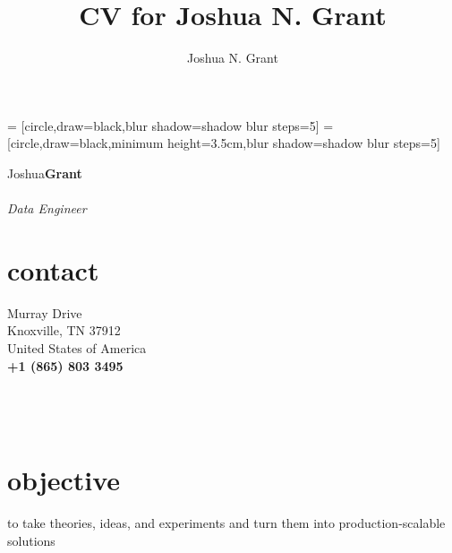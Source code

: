 \documentclass[10pt]{article}%
\author{Joshua N. Grant}
\title{CV for Joshua N. Grant}
\begin{document}
%
%
 = [circle,draw=black,blur shadow={shadow blur steps=5}]%
 = [circle,draw=black,minimum height=3.5cm,blur shadow={shadow blur steps=5}]%
\begin{minipage}[ht]{.25\linewidth}%
  \setlength{\headsep}{-10pt}
  \setlength{\voffset}{-0.75in}
   {\Large Joshua\huge\textbf{Grant}} \\ \\
   {\large \textit{Data Engineer}}
   \section*{\faUser{} contact}%
      Murray Drive \\
     Knoxville, TN 37912 \\
     United States of America  \\
     \textbf{+1 (865) 803 3495} \faMobile \\
     \href{mailto:jngrant9@gmail.com}{\color{linkcolor}{jngrant9@gmail.com \faEnvelope}} \\
     \href{http://notjustadatum.blogspot.com}{\color{linkcolor}{notjustadatum.blogspot.com \faBold}} \\
     \href{http://github.com/sempervent}{\color{linkcolor}{github.com/sempervent \faGithubAlt}} \\
     \href{https://www.linkedin.com/in/joshua-grant-a3842968/}{\color{linkcolor}{\small linkedin.com/in/joshuanagrant} \faLinkedin}
     \flushleft%
   \section*{\faBullseye{} objective}%
   \flushright
   to take theories, ideas, and experiments and turn them into production-scalable solutions
   \flushleft

\end{minipage}
\end{document}
